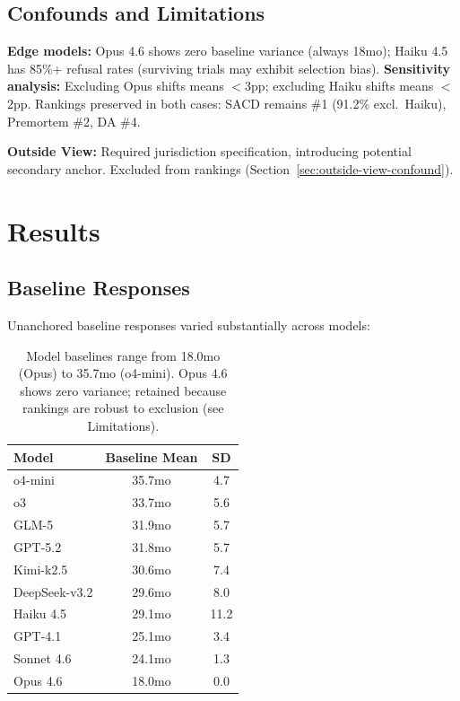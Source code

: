 \documentclass[11pt]{article}
\begin{document}
\subsection{Confounds and Limitations}

\textbf{Edge models:} Opus 4.6 shows zero baseline variance (always 18mo); Haiku 4.5 has 85\%+ refusal rates (surviving trials may exhibit selection bias). \textbf{Sensitivity analysis:} Excluding Opus shifts means $<$3pp; excluding Haiku shifts means $<$2pp. Rankings preserved in both cases: SACD remains \#1 (91.2\% excl.\ Haiku), Premortem \#2, DA \#4.

\textbf{Outside View:} Required jurisdiction specification, introducing potential secondary anchor. Excluded from rankings (Section~\ref{sec:outside-view-confound}).

\section{Results}

\subsection{Baseline Responses}

Unanchored baseline responses varied substantially across models:

\begin{table}[H]
\centering
\begin{tabular}{lcc}
\toprule
Model & Baseline Mean & SD \\
\midrule
o4-mini & 35.7mo & 4.7 \\
o3 & 33.7mo & 5.6 \\
GLM-5 & 31.9mo & 5.7 \\
GPT-5.2 & 31.8mo & 5.7 \\
Kimi-k2.5 & 30.6mo & 7.4 \\
DeepSeek-v3.2 & 29.6mo & 8.0 \\
Haiku 4.5 & 29.1mo & 11.2 \\
GPT-4.1 & 25.1mo & 3.4 \\
Sonnet 4.6 & 24.1mo & 1.3 \\
Opus 4.6 & 18.0mo & 0.0 \\
\bottomrule
\end{tabular}
\caption{Model baselines range from 18.0mo (Opus) to 35.7mo (o4-mini). Opus 4.6 shows zero variance; retained because rankings are robust to exclusion (see Limitations).}
\label{tab:baselines}
\end{table}
\end{document}
